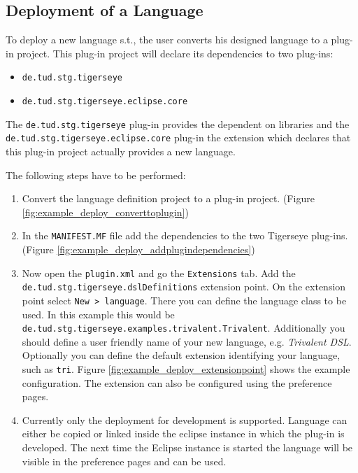   \subsection{Deployment of a \tiger Language}
  
  To deploy a new language s.t., the user converts his designed language to a plug-in project. This plug-in project will declare its dependencies to two \tiger plug-ins:
  \begin{itemize}
   \item \texttt{de.tud.stg.tigerseye}
   \item \texttt{de.tud.stg.tigerseye.eclipse.core}
  \end{itemize}
  The \texttt{de.tud.stg.tigerseye} plug-in provides the dependent on libraries and the \texttt{de.tud.stg.tigerseye.eclipse.core} plug-in the extension which declares that this plug-in project actually provides a new language.
  
  The following steps have to be performed:
  \begin{enumerate}
   \item Convert the language definition project to a plug-in project. (Figure \ref{fig:example_deploy_converttoplugin})
   \item In the \texttt{MANIFEST.MF} file add the dependencies to the two Tigerseye plug-ins. (Figure \ref{fig:example_deploy_addplugindependencies})
   \item Now open the \texttt{plugin.xml} and go the \texttt{Extensions} tab. Add the \texttt{de.tud.stg.tigerseye.dslDefinitions} extension point. On the extension point select \texttt{New > language}. There you can define the language class to be used. In this example this would be \texttt{de.tud.stg.tigerseye.examples.trivalent.Trivalent}. Additionally you should define a user friendly name of your new language, e.g. \emph{Trivalent DSL}. Optionally you can define the default extension identifying your language, such as \texttt{tri}. Figure \ref{fig:example_deploy_extensionpoint} shows the example configuration. The extension can also be configured using the \tiger preference pages.
   \item Currently only the deployment for development is supported. Language can either be copied or linked inside the eclipse instance in which the \tiger plug-in is developed. The next time the \tiger Eclipse instance is started the language will be visible in the preference pages and can be used.
  \end{enumerate}

